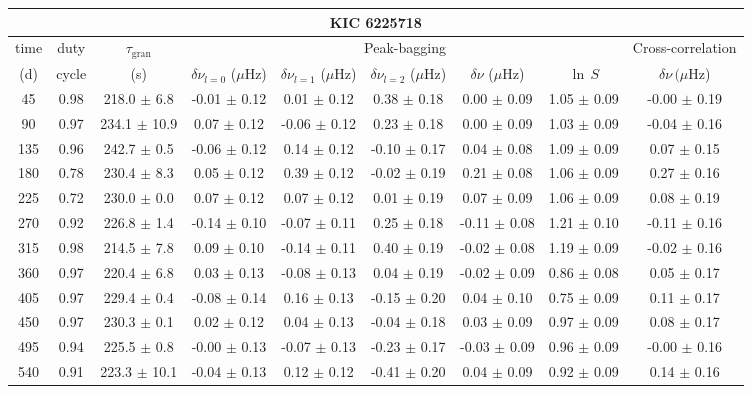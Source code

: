 \documentclass[twocolumn]{aastex61}%
\begin{document}
\begin{table*}[ht]\centering\fontsize{9.}{7.}\selectfont
\begin{tabular}{ccc|ccccc|c}
\multicolumn{9}{c}{KIC 6225718}\\ \hline\hline
time & duty & $\tau_\text{gran}$ &\multicolumn{5}{c|}{Peak-bagging}&Cross-correlation\\
(d)& cycle & (s)&$\delta\nu_{l=0}$ ($\mu$Hz) & $\delta\nu_{l=1}$ ($\mu$Hz) & $\delta\nu_{l=2}$ ($\mu$Hz) & $\delta\nu$ ($\mu$Hz)& $\ln\,S$ & $\delta\nu\,(\mu$Hz)\\\hline
45 & 0.98 & 218.0 $\pm$ 6.8 & -0.01 $\pm$ 0.12 & 0.01 $\pm$ 0.12 & 0.38 $\pm$ 0.18 & 0.00 $\pm$ 0.09 & 1.05 $\pm$ 0.09 & -0.00 $\pm$ 0.19\\
90 & 0.97 & 234.1 $\pm$ 10.9 & 0.07 $\pm$ 0.12 & -0.06 $\pm$ 0.12 & 0.23 $\pm$ 0.18 & 0.00 $\pm$ 0.09 & 1.03 $\pm$ 0.09 & -0.04 $\pm$ 0.16\\
135 & 0.96 & 242.7 $\pm$ 0.5 & -0.06 $\pm$ 0.12 & 0.14 $\pm$ 0.12 & -0.10 $\pm$ 0.17 & 0.04 $\pm$ 0.08 & 1.09 $\pm$ 0.09 & 0.07 $\pm$ 0.15\\
180 & 0.78 & 230.4 $\pm$ 8.3 & 0.05 $\pm$ 0.12 & 0.39 $\pm$ 0.12 & -0.02 $\pm$ 0.19 & 0.21 $\pm$ 0.08 & 1.06 $\pm$ 0.09 & 0.27 $\pm$ 0.16\\
225 & 0.72 & 230.0 $\pm$ 0.0 & 0.07 $\pm$ 0.12 & 0.07 $\pm$ 0.12 & 0.01 $\pm$ 0.19 & 0.07 $\pm$ 0.09 & 1.06 $\pm$ 0.09 & 0.08 $\pm$ 0.19\\
270 & 0.92 & 226.8 $\pm$ 1.4 & -0.14 $\pm$ 0.10 & -0.07 $\pm$ 0.11 & 0.25 $\pm$ 0.18 & -0.11 $\pm$ 0.08 & 1.21 $\pm$ 0.10 & -0.11 $\pm$ 0.16\\
315 & 0.98 & 214.5 $\pm$ 7.8 & 0.09 $\pm$ 0.10 & -0.14 $\pm$ 0.11 & 0.40 $\pm$ 0.19 & -0.02 $\pm$ 0.08 & 1.19 $\pm$ 0.09 & -0.02 $\pm$ 0.16\\
360 & 0.97 & 220.4 $\pm$ 6.8 & 0.03 $\pm$ 0.13 & -0.08 $\pm$ 0.13 & 0.04 $\pm$ 0.19 & -0.02 $\pm$ 0.09 & 0.86 $\pm$ 0.08 & 0.05 $\pm$ 0.17\\
405 & 0.97 & 229.4 $\pm$ 0.4 & -0.08 $\pm$ 0.14 & 0.16 $\pm$ 0.13 & -0.15 $\pm$ 0.20 & 0.04 $\pm$ 0.10 & 0.75 $\pm$ 0.09 & 0.11 $\pm$ 0.17\\
450 & 0.97 & 230.3 $\pm$ 0.1 & 0.02 $\pm$ 0.12 & 0.04 $\pm$ 0.13 & -0.04 $\pm$ 0.18 & 0.03 $\pm$ 0.09 & 0.97 $\pm$ 0.09 & 0.08 $\pm$ 0.17\\
495 & 0.94 & 225.5 $\pm$ 0.8 & -0.00 $\pm$ 0.13 & -0.07 $\pm$ 0.13 & -0.23 $\pm$ 0.17 & -0.03 $\pm$ 0.09 & 0.96 $\pm$ 0.09 & -0.00 $\pm$ 0.16\\
540 & 0.91 & 223.3 $\pm$ 10.1 & -0.04 $\pm$ 0.13 & 0.12 $\pm$ 0.12 & -0.41 $\pm$ 0.20 & 0.04 $\pm$ 0.09 & 0.92 $\pm$ 0.09 & 0.14 $\pm$ 0.16\\

\end{tabular}
\end{table*}
\end{document}
